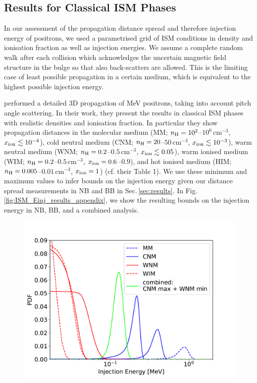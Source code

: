 \documentclass[doublespace,nopageskip]{VTthesis} %
\newcommand{\mrm}[1]{\mathrm{#1}}
\begin{document}
\begin{appendices}
	
	\section{Results for Classical ISM Phases}\label{sec:ISM_phases_results}
	In our assessment of the propagation distance spread and therefore injection energy of positrons, we used a parametrised grid of ISM conditions in density and ionisation fraction as well as injection energies.
	We assume a complete random walk after each collision which acknowledges the uncertain magnetic field structure in the bulge so that also back-scatters are allowed.
	This is the limiting case of least possible propagation in a certain medium, which is equivalent to the highest possible injection energy.
	
	\citet{Jean2009_511ISM} performed a detailed 3D propagation of MeV positrons, taking into account pitch angle scattering.
	In their work, they present the results in classical ISM phases with realistic densities and ionisation fraction.
	In particular they show propagation distances in the molecular medium (MM; $n_{\rm H} = 10^2$--$10^6\,\mrm{cm^{-3}}$, $x_{\rm ion} \lesssim 10^{-4}$), cold neutral medium (CNM; $n_{\rm H} = 20$--$50\,\mrm{cm^{-3}}$, $x_{\rm ion} \lesssim 10^{-3}$), warm neutral medium (WNM; $n_{\rm H} = 0.2$--$0.5\,\mrm{cm^{-3}}$, $x_{\rm ion} \lesssim 0.05$), warm ionised medium (WIM; $n_{\rm H} = 0.2$--$0.5\,\mrm{cm^{-3}}$, $x_{\rm ion} = 0.6$--$0.9$), and hot ionised medium (HIM; $n_{\rm H} = 0.005$--$0.01\,\mrm{cm^{-3}}$, $x_{\rm ion} = 1$) (cf. their Table 1).
	We use these minimum and maximum values to infer bounds on the injection energy given our distance spread measurements in NB and BB in Sec.\,\ref{sec:results}.
	In Fig.\,\ref{fig:ISM_Einj_results_appendix}, we show the resulting bounds on the injection energy in NB, BB, and a combined analysis.
	\begin{figure}
		\centering
		\includegraphics[width=0.8\columnwidth,trim=0.10in 0.1in 0.6in 0.6in,clip=true]{Figures/511keV/Comparison_NB_BB_Jean2009_Fig8_comb.pdf}%

\end{figure}
\end{appendices}
\end{document}
